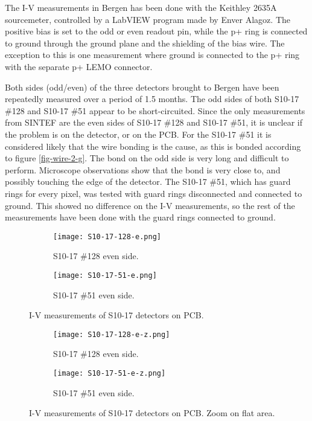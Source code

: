 \documentclass[../main/thesis.tex]{subfiles}
\begin{document}
The I-V measurements in Bergen has been done with the Keithley 2635A sourcemeter, controlled by a LabVIEW program made by Enver Alagoz. The positive bias is set to the odd or even readout pin, while the p+ ring is connected to ground through the ground plane and the shielding of the bias wire. The exception to this is one measurement where ground is connected to the p+ ring with the separate p+ LEMO connector. 

Both sides (odd/even) of the three detectors brought to Bergen have been repeatedly measured over a period of 1.5 months. The odd sides of both S10-17 \#128 and S10-17 \#51 appear to be short-circuited. Since the only measurements from SINTEF are the even sides of S10-17 \#128 and S10-17 \#51, it is unclear if the problem is on the detector, or on the \gls{PCB}. For the S10-17 \#51 it is considered likely that the wire bonding is the cause, as this is bonded according to figure \ref{fig-wire-2-g}. The bond on the odd side is very long and difficult to perform. Microscope observations show that the bond is very close to, and possibly touching the edge of the detector. The S10-17 \#51, which has guard rings for every pixel, was tested with guard rings disconnected and connected to ground. This showed no difference on the I-V measurements, so the rest of the measurements have been done with the guard rings connected to ground. 

\begin{figure}
	\centering
	\begin{subfigure}{.5\textwidth}
		\centering
		\texttt{[image: S10-17-128-e.png]}
		\caption{S10-17 \#128 even side.}
		\label{fig-S10-17-128-e}
	\end{subfigure}%
	\begin{subfigure}{.5\textwidth}
		\centering
		\texttt{[image: S10-17-51-e.png]}
		\caption{S10-17 \#51 even side.}
		\label{fig-S10-17-51-e} 
	\end{subfigure}
	\caption{I-V measurements of S10-17 detectors on PCB.}
	\label{fig-3d-iv-S10-17}
\end{figure}

\begin{figure}
	\centering
	\begin{subfigure}{.5\textwidth}
		\centering
		\texttt{[image: S10-17-128-e-z.png]}
		\caption{S10-17 \#128 even side.}
		\label{fig-S10-17-128-e-z}
	\end{subfigure}%
	\begin{subfigure}{.5\textwidth}
		\centering
		\texttt{[image: S10-17-51-e-z.png]}
		\caption{S10-17 \#51 even side.}
		\label{fig-S10-17-51-e-z} 
	\end{subfigure}
	\caption{I-V measurements of S10-17 detectors on PCB. Zoom on flat area.}
	\label{fig-3d-iv-S10-17-z}
\end{figure}
\end{document}
